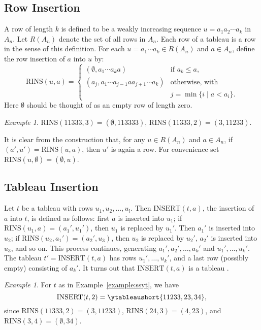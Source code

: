 \documentclass[10pt]{amsproc}
\theoremstyle{definition}
\theoremstyle{remark}
\newtheorem{example}[theorem]{Example}
\newcommand{\rowins}{\mathrm{RINS}}
\newcommand{\ins}{\mathrm{INSERT}}
\begin{document}
\subsection{Row Insertion}
\label{sec:row-insertion}A row of length $k$ is defined to be a weakly increasing sequence $u=a_1a_2\dotsb a_k$ in $A_n$.
Let $R(A_n)$ denote the set of all rows in $A_n$.
Each row of a tableau is a row in the sense of this definition.
For each $u=a_1\dotsb a_k\in R(A_n)$ and $a\in A_n$, define the row insertion of $a$ into $u$ by:
\begin{displaymath}
  \rowins(u,a) =
  \begin{cases}
    (\emptyset, a_1\dotsb a_k a) & \text{if } a_k\leq a,\\
    (a_j,a_1\dotsb a_{j-1}aa_{j+1}\dotsb a_k) & \text{otherwise, with}\\
    & j=\min\{i\mid a<a_i\}.
  \end{cases}
\end{displaymath}
Here $\emptyset$ should be thought of as an empty row of length zero.
\begin{example}
  $\rowins(11333,3) = (\emptyset,113333)$, $\rowins(11333,2)=(3,11233)$.
\end{example}
It is clear from the construction that, for any $u\in R(A_n)$ and $a\in A_n$, if $(a',u')=\rowins(u,a)$, then $u'$ is again a row.
For convenience set $\rowins(u,\emptyset)=(\emptyset,u)$.
\subsection{Tableau Insertion}
\label{sec:tableau-insertion}
Let $t$ be a tableau with rows $u_1,u_2,\dotsc, u_l$.
Then $\ins(t,a)$, the insertion of $a$ into $t$, is defined as follows: first $a$ is inserted into $u_1$; if $\rowins(u_1,a)=(a_1',u_1')$, then $u_1$ is replaced by $u_1'$.
Then $a_1'$ is inserted into $u_2$; if $\rowins(u_2,a_1')=(a_2',u_3)$, then $u_2$ is replaced by $u_2'$, $a_2'$ is inserted into $u_3$, and so on.
This process continues, generating $a_1',a_2',\dotsc,a_k'$ and $u_1',\dotsc,u_k'$.
The tableau $t'=\ins(t,a)$ has rows $u_1',\dotsc,u_k'$, and a last row (possibly empty) consisting of $a_k'$.
It turns out that $\ins(t,a)$ is a tableau \cite{knuth}.
\begin{example}
  \label{example:insertion}
  For $t$ as in Example~\ref{example:ssyt}, we have
  \begin{displaymath}
    \ins(t,2) = \ytableaushort{11233,23,34},
  \end{displaymath}
  since $\rowins(11333,2)=(3,11233)$, $\rowins(24,3)=(4,23)$, and $\rowins(3,4)=(\emptyset, 34)$.
\end{example}
\end{document}

